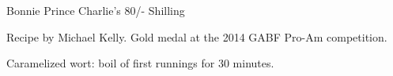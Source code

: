 \begin{recipe}{Bonnie Prince Charlie's 80/- Shilling} %

\begin{aboutblock}
Recipe by Michael Kelly. Gold medal at the 2014 GABF Pro-Am competition.
\sourceaha
\end{aboutblock}


\begin{methodandtiming}

\begin{mashsteps}
\end{mashsteps}

\begin{fermentationsteps}
\end{fermentationsteps}

\begin{directions}
Caramelized wort: boil  of first runnings for 30 minutes.
\end{directions}

\end{methodandtiming}

\recipebreak

\begin{ingredientsblock}

\begin{malts}
\end{malts}

\begin{hops}
\end{hops}


\end{ingredientsblock}

\end{recipe}

